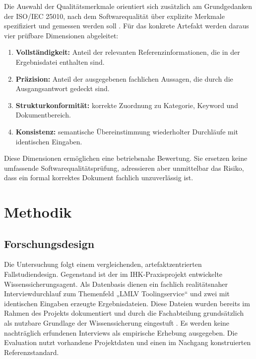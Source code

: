 \documentclass[
  10pt,
  ngerman,
  a4paper,
  toc=graduated,
  numbers=noenddot,
  headings=standardclasses,
  nonumberlist
]{scrartcl}
\begin{document}
Die Auswahl der Qualitätsmerkmale orientiert sich zusätzlich am Grundgedanken der ISO/IEC 25010, nach dem Softwarequalität über explizite Merkmale spezifiziert und gemessen werden soll \cite{iso25010}. Für das konkrete Artefakt werden daraus vier prüfbare Dimensionen abgeleitet:

\begin{enumerate}
\item \textbf{Vollständigkeit:} Anteil der relevanten Referenzinformationen, die in der Ergebnisdatei enthalten sind.
\item \textbf{Präzision:} Anteil der ausgegebenen fachlichen Aussagen, die durch die Ausgangsantwort gedeckt sind.
\item \textbf{Strukturkonformität:} korrekte Zuordnung zu Kategorie, Keyword und Dokumentbereich.
\item \textbf{Konsistenz:} semantische Übereinstimmung wiederholter Durchläufe mit identischen Eingaben.
\end{enumerate}

Diese Dimensionen ermöglichen eine betriebsnahe Bewertung. Sie ersetzen keine umfassende Softwarequalitätsprüfung, adressieren aber unmittelbar das Risiko, dass ein formal korrektes Dokument fachlich unzuverlässig ist.

\newpage
\section{Methodik}

\subsection{Forschungsdesign}

Die Untersuchung folgt einem vergleichenden, artefaktzentrierten Fallstudiendesign. Gegenstand ist der im IHK-Praxisprojekt entwickelte Wissenssicherungsagent. Als Datenbasis dienen ein fachlich realitätsnaher Interviewdurchlauf zum Themenfeld „LMLV Toolingservice“ und zwei mit identischen Eingaben erzeugte Ergebnisdateien. Diese Dateien wurden bereits im Rahmen des Projekts dokumentiert und durch die Fachabteilung grundsätzlich als nutzbare Grundlage der Wissenssicherung eingestuft \cite{sommer2026projekt}. Es werden keine nachträglich erfundenen Interviews als empirische Erhebung ausgegeben. Die Evaluation nutzt vorhandene Projektdaten und einen im Nachgang konstruierten Referenzstandard.
\end{document}
